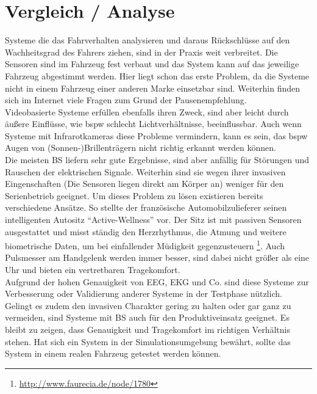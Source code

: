 {\section{Vergleich / Analyse}
\label{chap:an}
Systeme die das Fahrverhalten analysieren und daraus Rückschlüsse auf den Wachheitsgrad des Fahrers ziehen, sind in der Praxis weit verbreitet. Die Sensoren sind im Fahrzeug fest verbaut und das System kann auf das jeweilige Fahrzeug abgestimmt werden. Hier liegt schon das erste Problem, da die Systeme nicht in einem Fahrzeug einer anderen Marke einsetzbar sind. Weiterhin finden sich im Internet viele Fragen zum Grund der Pausenempfehlung. \\

Videobasierte Systeme erfüllen ebenfalls ihren Zweck, sind aber leicht durch äußere Einflüsse, wie \acl{bspw} schlecht Lichtverhältnisse, beeinflussbar. Auch wenn Systeme mit Infrarotkameras diese Probleme vermindern, kann es sein, das \acl{bspw} Augen von (Sonnen-)Brillenträgern nicht richtig erkannt werden können. \\

Die meisten \acl{BS} liefern sehr gute Ergebnisse, sind aber anfällig für Störungen und Rauschen der elektrischen Signale. Weiterhin sind sie  wegen ihrer invasiven Eingenschaften (Die Sensoren liegen direkt am Körper an) weniger für den Serienbetrieb geeignet. Um dieses Problem zu lösen existieren bereits verschiedene Ansätze. So stellte der französische Automobilzulieferer seinen intelligenten Autositz "`Active-Wellness"' vor. Der Sitz ist mit passiven Sensoren ausgestattet und misst ständig den Herzrhythmus, die Atmung und weitere biometrische Daten, um bei einfallender Müdigkeit gegenzusteuern \footnote{\url{http://www.faurecia.de/node/1780}}. Auch Pulsmesser am Handgelenk werden immer besser, sind dabei nicht größer als eine Uhr und bieten ein vertretbaren Tragekomfort. \\

Aufgrund der hohen Genauigkeit von EEG, EKG und Co. sind diese Systeme zur Verbesserung oder Validierung anderer Systeme in der Testphase nützlich. Gelingt es zudem den invasiven Charakter gering zu halten oder gar ganz zu vermeiden, sind Systeme mit \acl{BS} auch für den Produktiveinsatz geeignet. Es bleibt zu zeigen, dass Genauigkeit und Tragekomfort im richtigen Verhältnis stehen. Hat sich ein System in der Simulationsumgebung bewährt, sollte das System in einem realen Fahrzeug getestet werden können.  \\

}
